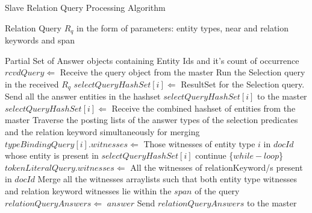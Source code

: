 \documentclass[11pt]{report}
\newcommand\INPUT{\item[\textbf{Input:}]}
\newcommand\OUTPUT{\item[\textbf{Output:}]}
\begin{document}
\begin{algorithm}
 \caption{Slave Relation Query Processing Algorithm}
 \begin{algorithmic}[1]
\INPUT Relation Query $R_q$ in the form of parameters: entity types, near and relation keywords and span
\OUTPUT Partial Set of Answer objects containing Entity Ids and it's count of occurrence
\STATE $rcvdQuery \Leftarrow$ Receive the query object from the master
  \STATE Run the Selection query in the received $R_q$ 
  \STATE $selectQueryHashSet[i] \Leftarrow$ ResultSet for the Selection query.
  \STATE Send all the answer entities in the hashset $selectQueryHashSet[i]$ to the master
  \STATE $selectQueryHashSet[i] \Leftarrow$ Receive the combined hashset of entities from the master
\ENDFOR
\STATE Traverse the posting lists of the answer types of the selection predicates and the relation keyword simultaneously for merging
  \STATE $typeBindingQuery[i].witnesses \Leftarrow$ Those witnesses of entity type $i$ in $docId$ whose entity is present in $selectQueryHashSet[i]$
      \STATE continue \{$while-loop$\}
    \ENDIF
  \ENDFOR
  \STATE $tokenLiteralQuery.witnesses \Leftarrow$ All the witnesses of relationKeyword/s present in $docId$
  \STATE Merge all the witnesses arraylists such that both entity type witnesses and relation keyword witnesses lie within the $span$ of the query
     \STATE $relationQueryAnswers \Leftarrow$ $answer$
  \ENDIF
\ENDIF
\ENDWHILE
\STATE Send $relationQueryAnswers$ to the master
 \end{algorithmic}
\end{algorithm}
\end{document}

